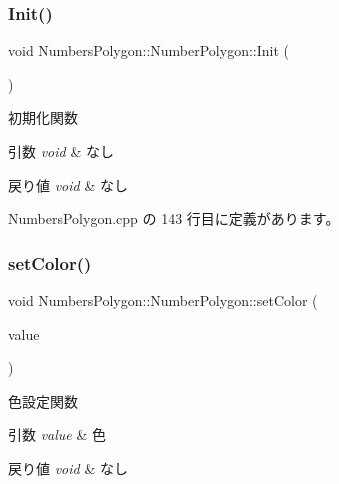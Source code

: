\subsubsection{\texorpdfstring{Init()}{Init()}}
{\footnotesize\ttfamily void Numbers\+Polygon\+::\+Number\+Polygon\+::\+Init (\begin{DoxyParamCaption}{ }\end{DoxyParamCaption})}



初期化関数 


\begin{DoxyParams}{引数}
{\em void} & なし \\
\hline
\end{DoxyParams}

\begin{DoxyRetVals}{戻り値}
{\em void} & なし \\
\hline
\end{DoxyRetVals}


 Numbers\+Polygon.\+cpp の 143 行目に定義があります。

\mbox{\label{class_numbers_polygon_1_1_number_polygon_aa3f7ad5e57a7c517637713e93b923def}} 
\subsubsection{\texorpdfstring{set\+Color()}{setColor()}}
{\footnotesize\ttfamily void Numbers\+Polygon\+::\+Number\+Polygon\+::set\+Color (\begin{DoxyParamCaption}\item[{\mbox{\hyperlink{_vector3_d_8h_a680c30c4a07d86fe763c7e01169cd6cc}{X\+Color4}}}]{value }\end{DoxyParamCaption})}



色設定関数 


\begin{DoxyParams}{引数}
{\em value} & 色 \\
\hline
\end{DoxyParams}

\begin{DoxyRetVals}{戻り値}
{\em void} & なし \\
\hline
\end{DoxyRetVals}


